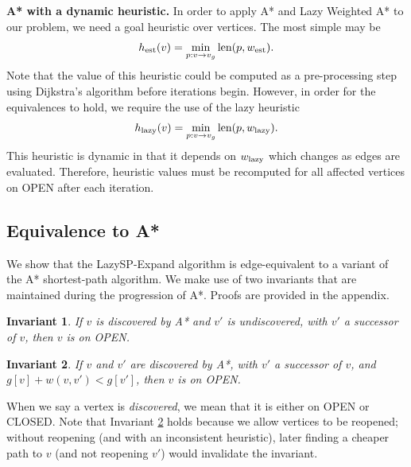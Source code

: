 \documentclass[nobib]{tufte-book}
\newcommand{\ms}[1]{\mbox{\scriptsize #1}}
\newtheorem{invariant}{Invariant}
\begin{document}
\textbf{A* with a dynamic heuristic.}
In order to apply A* and Lazy Weighted A* to our problem,
we need a goal heuristic over vertices.
The most simple may be
\begin{equation}
   h_{\ms{est}}(v) = \min_{p : v \rightarrow v_g} \mbox{len}(p, w_{\ms{est}}).
   \label{eqn:h_est}
\end{equation}
Note that the value of this heuristic could be computed as a
pre-processing step using Dijkstra's algorithm \citep{dijkstra1959anote}
before iterations begin.
However,
in order for the equivalences to hold,
we require the use of the lazy heuristic
\begin{equation}
   h_{\ms{lazy}}(v) = \min_{p : v \rightarrow v_g} \mbox{len}(p, w_{\ms{lazy}}).
   \label{eqn:h_lazy}
\end{equation}
This heuristic is dynamic in that it depends on $w_{\ms{lazy}}$
which changes as edges are evaluated.
Therefore,
heuristic values must be recomputed for all affected vertices on OPEN
after each iteration.

\subsection{Equivalence to A*}

We show that the LazySP-Expand algorithm
is edge-equivalent to a variant of the A*
shortest-path algorithm.
We make use of two invariants that are maintained during the
progression of A*.
Proofs are provided in the appendix.
\begin{invariant}
If $v$ is discovered by A* and $v'$ is undiscovered,
with $v'$ a successor of $v$,
then $v$ is on OPEN.%
\label{inv:astar-cundisc-popen}%
\end{invariant}
\begin{invariant}
If $v$ and $v'$ are discovered by A*,
with $v'$ a successor of $v$,
and $g[v] + w(v,v') < g[v']$,
then $v$ is on OPEN.%
\label{inv:astar-wless-popen}%
\end{invariant}
When we say a vertex is \emph{discovered},
we mean that it is either on OPEN or CLOSED.
Note that Invariant \ref{inv:astar-wless-popen} holds
because we allow vertices to be reopened;
without reopening (and with an inconsistent heuristic),
later finding a cheaper path to $v$ (and not reopening $v'$)
would invalidate the invariant.
\end{document}
